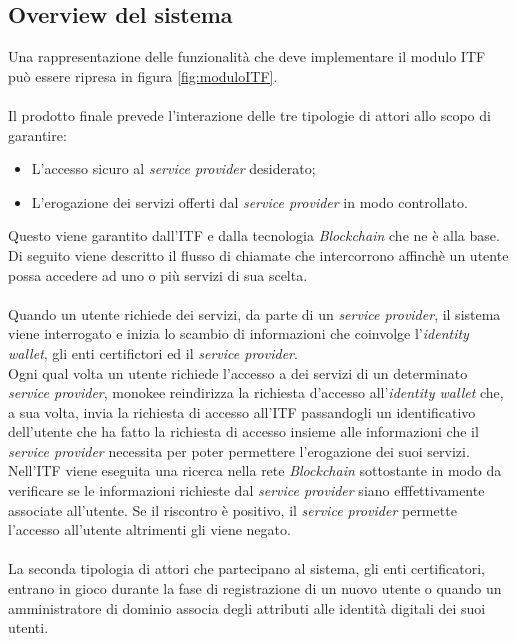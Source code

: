 \subsection{Overview del sistema}
Una rappresentazione delle funzionalità che deve implementare il modulo \gls{ITF} può essere ripresa in figura \ref{fig:moduloITF}.\\\\
Il prodotto finale prevede l'interazione delle tre tipologie di attori allo scopo di garantire:
\begin{itemize}
	\item L'accesso sicuro al \textit{service provider} desiderato;
	\item L'erogazione dei servizi offerti dal \textit{service provider} in modo controllato.
\end{itemize}
Questo viene garantito dall'\gls{ITF} e dalla tecnologia \textit{Blockchain} che ne è alla base.\\
Di seguito viene descritto il flusso di chiamate che intercorrono affinchè un utente possa accedere ad uno o più servizi di sua scelta.\\\\
Quando un utente richiede dei servizi, da parte di un \textit{service provider}, il sistema viene interrogato e inizia lo scambio di informazioni che coinvolge l'\textit{identity wallet}, gli enti certifictori ed il \textit{service provider}.\\
Ogni qual volta un utente richiede l'accesso a dei servizi di un determinato \textit{service provider}, \gls{monokee} reindirizza la richiesta d'accesso all'\textit{identity wallet} che, a sua volta, invia la richiesta di accesso all'\gls{ITF} passandogli un identificativo dell'utente che ha fatto la richiesta di accesso insieme alle informazioni che il \textit{service provider} necessita per poter permettere l'erogazione dei suoi servizi.\\
Nell'\gls{ITF} viene eseguita una ricerca nella rete \textit{Blockchain} sottostante in modo da verificare se le informazioni richieste dal \textit{service provider} siano efffettivamente associate all'utente. Se il riscontro è positivo, il \textit{service provider} permette l'accesso all'utente altrimenti gli viene negato.\\\\
La seconda tipologia di attori che partecipano al sistema, gli enti certificatori, entrano in gioco durante la fase di registrazione di un nuovo utente o quando un amministratore di dominio associa degli attributi alle identità digitali dei suoi utenti.
